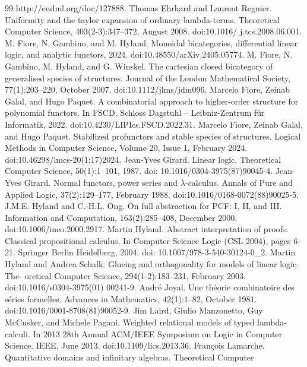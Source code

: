\documentclass[10pt,a4paper]{article}
\begin{document}
\begin{thebibliography}{99}
http://eudml.org/doc/127888.
 Thomas Ehrhard and Laurent Regnier. Uniformity and the taylor expansion of ordinary
lambda-terms. Theoretical Computer Science, 403(2-3):347–372, August 2008. doi:10.1016/
j.tcs.2008.06.001.
 M. Fiore, N. Gambino, and M. Hyland. Monoidal bicategories, differential linear logic, and
analytic functors, 2024. doi:10.48550/arXiv.2405.05774.
 M. Fiore, N. Gambino, M. Hyland, and G. Winskel. The cartesian closed bicategory of
generalised species of structures. Journal of the London Mathematical Society, 77(1):203–220,
October 2007. doi:10.1112/jlms/jdm096.
 Marcelo Fiore, Zeinab Galal, and Hugo Paquet. A combinatorial approach to higher-order
structure for polynomial functors. In FSCD. Schloss Dagstuhl – Leibniz-Zentrum für Informatik,
2022. doi:10.4230/LIPIcs.FSCD.2022.31.
 Marcelo Fiore, Zeinab Galal, and Hugo Paquet. Stabilized profunctors and stable species
of structures. Logical Methods in Computer Science, Volume 20, Issue 1, February 2024.
doi:10.46298/lmcs-20(1:17)2024.
 Jean-Yves Girard. Linear logic. Theoretical Computer Science, 50(1):1–101, 1987. doi:
10.1016/0304-3975(87)90045-4.
 Jean-Yves Girard. Normal functors, power series and \ensuremath{\lambda}-calculus. Annals of Pure and Applied
Logic, 37(2):129–177, February 1988. doi:10.1016/0168-0072(88)90025-5.
 J.M.E. Hyland and C.-H.L. Ong. On full abstraction for PCF: I, II, and III. Information and
Computation, 163(2):285–408, December 2000. doi:10.1006/inco.2000.2917.
 Martin Hyland. Abstract interpretation of proofs: Classical propositional calculus. In
Computer Science Logic (CSL 2004), pages 6–21. Springer Berlin Heidelberg, 2004. doi:
10.1007/978-3-540-30124-0\_2.
 Martin Hyland and Andrea Schalk. Glueing and orthogonality for models of linear logic. The-
oretical Computer Science, 294(1-2):183–231, February 2003. doi:10.1016/s0304-3975(01)
00241-9.
 André Joyal. Une théorie combinatoire des séries formelles. Advances in Mathematics,
42(1):1–82, October 1981. doi:10.1016/0001-8708(81)90052-9.
 Jim Laird, Giulio Manzonetto, Guy McCusker, and Michele Pagani. Weighted relational
models of typed lambda-calculi. In 2013 28th Annual ACM/IEEE Symposium on Logic in
Computer Science. IEEE, June 2013. doi:10.1109/lics.2013.36.
 François Lamarche. Quantitative domains and infinitary algebras. Theoretical Computer

\end{thebibliography}
\end{document}
